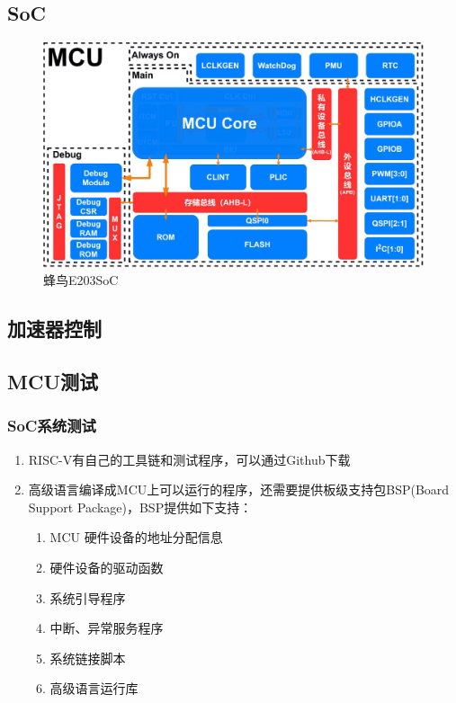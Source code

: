 \documentclass{article}
\begin{document}
\subsection{SoC}
\begin{figure}[H]
\begin{center}
  \includegraphics[width=\textwidth]{soc}
\end{center}
\caption{蜂鸟E203SoC}
\label{fig: SoC1}
\end{figure}

\subsection{加速器控制}
\subsection{MCU测试}
\subsubsection{SoC系统测试}
\begin{enumerate}
  \item RISC-V有自己的工具链和测试程序，可以通过Github下载\cite{riscv3}
  \item 高级语言编译成MCU上可以运行的程序，还需要提供板级支持包BSP(Board Support Package)\cite{riscv1}，BSP提供如下支持：
    \begin{enumerate}
      \item MCU 硬件设备的地址分配信息
      \item 硬件设备的驱动函数
      \item 系统引导程序
      \item 中断、异常服务程序
      \item 系统链接脚本
      \item 高级语言运行库
    \end{enumerate}
\end{enumerate}
\end{document}
